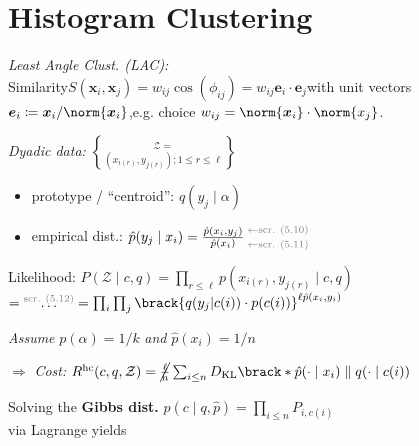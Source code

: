 \section{Histogram Clustering}

\emph{Least Angle Clust. (LAC): {\normalfont\sffamily[Idea]}}\\
Similarity\enspace $S(\bm x_i, \bm x_j) = w_{ij} \cos(\phi_{ij}) = w_{ij} \bm e_i \cdot \bm e_j$\enspace with unit vectors\enspace $\bm e_i \coloneqq \bm x_i / \norm{\bm x_i}$,\enspace e.g. choice $w_{ij} = \norm{\bm x_i} \cdot \norm{x_j}$.

\emph{Dyadic data:}\enspace
$\mathcal Z = \brace{ (x_{i(r)}, y_{j(r)}) ; 1\leq r\leq \ell }$

\begin{itemize}
    \item prototype / ``centroid'':\enspace
        $q(y_j \mid \alpha)$
    \item empirical dist.:\enspace
        $\hat p(y_j\mid x_i)
        = \frac{\hat p(x_i, y_j)}{\hat p(x_i)}
        \:\substack{
            \color{gray} \leftarrow \text{scr. (5.10)} \\[2pt]
            \color{gray} \leftarrow \text{scr. (5.11)}
        }$
    \iffalse
    $= \frac{
        \frac1\ell \sum_{r\leq\ell} \delta_{x_i, x_{i(r)}} \delta_{y_j, y_{j(r)}}
      }{
        \sum_{j\leq m} \hat p(x_i, y_j)
    }$
    \fi
\end{itemize}

Likelihood:\enspace
$P(\mathcal Z\mid c,q) = \prod_{r\leq\ell} p(x_{i(r)}, y_{j(r)} \mid c,q)$\\\quad
$= \overset{\text{\color{gray} scr. (5.12)}}{\ldots}
= \prod_i \prod_j \brack{ q(y_j\vert c(i)) \cdot p(c(i)) }^{\ell \hat p(x_i, y_i)}$

\textit{Assume} $p(\alpha)=1/k$ \textit{and} $\hat p(x_i) = 1/n$

$\Rightarrow$ \emph{Cost:}
$R\ap{hc} (c, q, \mathcal Z) = \cancel{\frac{\ell}{n}} \sum_{i\leq n} D\ped{KL} \brack*{\hat p(\cdot\mid x_i) \parallel q(\cdot\mid c(i))}$

Solving the \textbf{Gibbs dist.} $p(c \mid q, \hat p) = \prod_{i\leq n} P_{i, c(i)}$\\
via Lagrange yields 
{\color{gray}\scriptsize {}}


